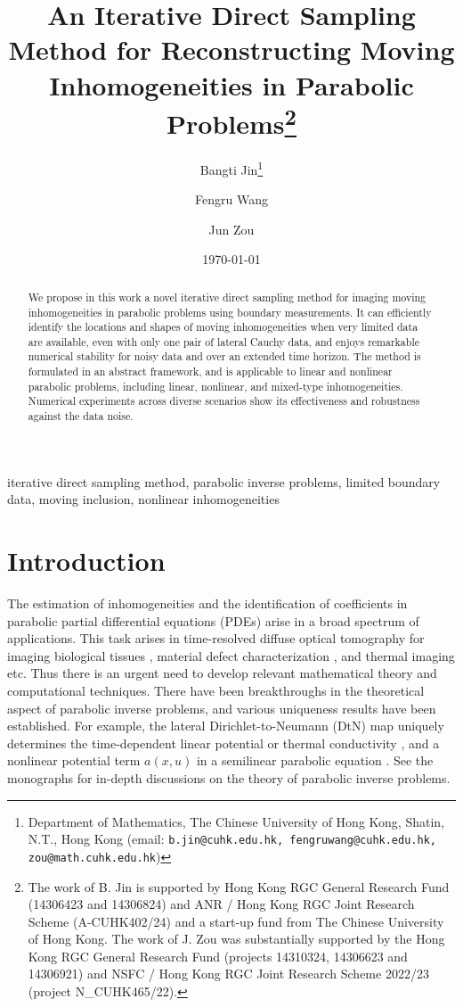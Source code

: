 \documentclass[onefignum,onetabnum]{siamart190516}
\title{An Iterative Direct Sampling Method for Reconstructing Moving Inhomogeneities in Parabolic Problems\thanks{The work of B. Jin is supported by Hong Kong RGC General Research Fund (14306423 and 14306824) and ANR / Hong Kong RGC Joint Research Scheme (A-CUHK402/24) and a start-up fund from The Chinese University of Hong Kong. The work of J. Zou was substantially supported by the Hong Kong RGC General Research Fund (projects 14310324, 14306623 and 14306921) and NSFC / Hong Kong RGC Joint Research Scheme 2022/23 (project N\_CUHK465/22).}}
\author{Bangti Jin\thanks{Department of Mathematics, The Chinese University of Hong Kong, Shatin, N.T., Hong Kong (email: \texttt{b.jin@cuhk.edu.hk, fengruwang@cuhk.edu.hk, zou@math.cuhk.edu.hk})}\and
Fengru Wang\footnotemark[2] \and
Jun Zou\footnotemark[2]
}
\date{\today}
\numberwithin{equation}{section}
\begin{document}
\maketitle

\begin{abstract}
We propose in this work a novel iterative direct sampling method for imaging moving inhomogeneities in parabolic problems using boundary measurements.
It can efficiently identify the locations and shapes of moving inhomogeneities when very limited data are available, even with only one pair of lateral Cauchy data, and enjoys remarkable numerical stability for noisy data and over an extended time horizon.
The method is formulated in an abstract framework, and is applicable to linear and nonlinear parabolic problems, including linear, nonlinear, and mixed-type inhomogeneities.
Numerical experiments across diverse scenarios show its effectiveness and robustness against the data noise.
\end{abstract}

\begin{keywords}
iterative direct sampling method, parabolic inverse problems, limited boundary data, moving inclusion, nonlinear inhomogeneities
\end{keywords}


\section{Introduction}

The estimation of inhomogeneities and the identification of coefficients in parabolic partial differential equations (PDEs) arise in a broad spectrum of applications.
This task arises in time-resolved diffuse optical tomography for imaging biological tissues \cite{Zhang2001}, material defect characterization \cite{Krings2012,Nair2017}, and thermal imaging \cite{Ammari2017} etc.
Thus there is an urgent need to develop relevant mathematical theory and computational techniques. There have been breakthroughs in the theoretical aspect of parabolic inverse problems, and various uniqueness results have been established.
For example, the lateral Dirichlet-to-Neumann (DtN) map uniquely determines the time-dependent linear potential or thermal conductivity \cite{Rozhkov1997,Isakov2017}, and a nonlinear potential term $a(x,u)$ in a semilinear parabolic equation \cite{Isakov1993}. See the monographs \cite{Cannon:1984,Isakov2017} for in-depth discussions on the theory of parabolic inverse problems.
\end{document}
